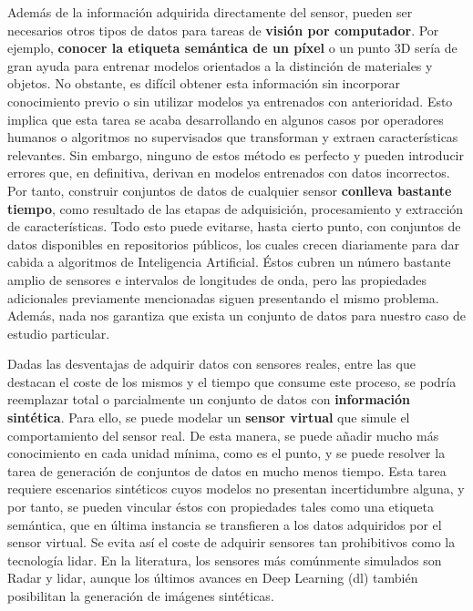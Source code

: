 Además de la información adquirida directamente del sensor, pueden ser necesarios otros tipos de datos para tareas de \textbf{visión por computador}. Por ejemplo, \textbf{conocer la etiqueta semántica de un píxel} o un punto 3D sería de gran ayuda para entrenar modelos orientados a la distinción de materiales y objetos. No obstante, es difícil obtener esta información sin incorporar conocimiento previo o sin utilizar modelos ya entrenados con anterioridad. Esto implica que esta tarea se acaba desarrollando en algunos casos por operadores humanos o algoritmos no supervisados que transforman y extraen características relevantes. Sin embargo, ninguno de estos método es perfecto y pueden introducir errores que, en definitiva, derivan en modelos entrenados con datos incorrectos. Por tanto, construir conjuntos de datos de cualquier sensor \textbf{conlleva bastante tiempo}, como resultado de las etapas de adquisición, procesamiento y extracción de características. Todo esto puede evitarse, hasta cierto punto, con conjuntos de datos disponibles en repositorios públicos, los cuales crecen diariamente para dar cabida a algoritmos de Inteligencia Artificial. Éstos cubren un número bastante amplio de sensores e intervalos de longitudes de onda, pero las propiedades adicionales previamente mencionadas siguen presentando el mismo problema. Además, nada nos garantiza que exista un conjunto de datos para nuestro caso de estudio particular.

Dadas las desventajas de adquirir datos con sensores reales, entre las que destacan el coste de los mismos y el tiempo que consume este proceso, se podría reemplazar total o parcialmente un conjunto de datos con \textbf{información sintética}. Para ello, se puede modelar un \textbf{sensor virtual} que simule el comportamiento del sensor real. De esta manera, se puede añadir mucho más conocimiento en cada unidad mínima, como es el punto, y se puede resolver la tarea de generación de conjuntos de datos en mucho menos tiempo. Esta tarea requiere escenarios sintéticos cuyos modelos no presentan incertidumbre alguna, y por tanto, se pueden vincular éstos con propiedades tales como una etiqueta semántica, que en última instancia se transfieren a los datos adquiridos por el sensor virtual. Se evita así el coste de adquirir sensores tan prohibitivos como la tecnología \acrshort{lidar}. En la literatura, los sensores más comúnmente simulados son Radar y \acrshort{lidar}, aunque los últimos avances en Deep Learning (\acrshort{dl}) también posibilitan la generación de imágenes sintéticas.

